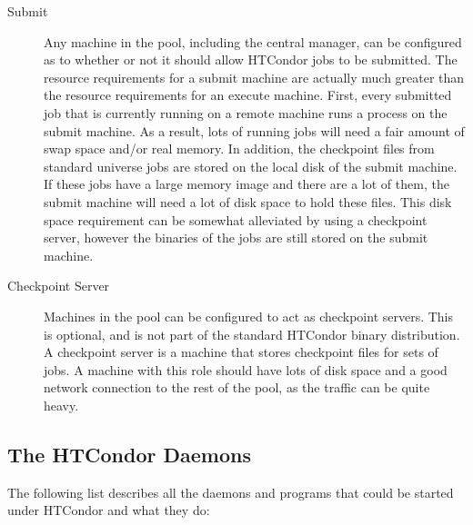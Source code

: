 \begin{description}
\item[Submit] Any machine in the pool,
including the central manager,
can be configured as to whether or not it should allow HTCondor
jobs to be submitted.
The resource requirements for a submit machine
are actually much greater than the resource requirements for an
execute machine.  First, every submitted job that is
currently running on a remote machine runs a process on
the submit machine.  
As a result, lots of running jobs
will need a fair amount of swap space and/or real memory.
In addition,
the checkpoint files from standard universe jobs are stored on 
the local disk of the submit machine.
If these jobs have a large
memory image and there are a lot of them, 
the submit machine will need a lot of disk space to hold these files.
This disk space requirement can be
somewhat alleviated by using a checkpoint server,
however the binaries of the jobs are still stored on the submit machine.

\item[Checkpoint Server]  Machines in the pool can be configured to act as
checkpoint servers.
This is optional, and is not part of the
standard HTCondor binary distribution.  A checkpoint server is a
machine that stores checkpoint files for sets of jobs.
A machine with this role should have lots of disk space
and a good network connection to the rest of the pool, as the traffic
can be quite heavy.

\end{description}

\subsection{\label{sec:HTCondor-Daemons}The HTCondor Daemons}

The following list describes all the daemons and programs that could
be started under HTCondor and what they do:

